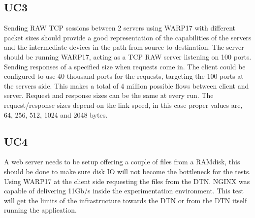 \subsection{UC3}
Sending RAW TCP sessions between 2 servers using WARP17 with different packet sizes should provide a good representation of the capabilities of the servers and the intermediate devices in the path from source to destination. 
The server should be running WARP17, acting as a TCP RAW server listening on 100 ports. Sending responses of a specified size when requests come in. The client could be configured to use 40 thousand ports for the requests, targeting the 100 ports at the servers side. This makes a total of 4 million possible flows between client and server. Request and response sizes can be the same at every run. The request/response sizes depend on the link speed, in this case proper values are, 64, 256, 512, 1024 and 2048 bytes. 

\subsection{UC4}
A web server needs to be setup offering a couple of files from a RAMdisk, this should be done to make sure disk IO will not become the bottleneck for the tests. Using WARP17 at the client side requesting the files from the DTN. NGINX was capable of delivering 11Gb/s inside the experimentation environment. This test will get the limits of the infrastructure towards the DTN or from the DTN itself running the application. 

\


 











